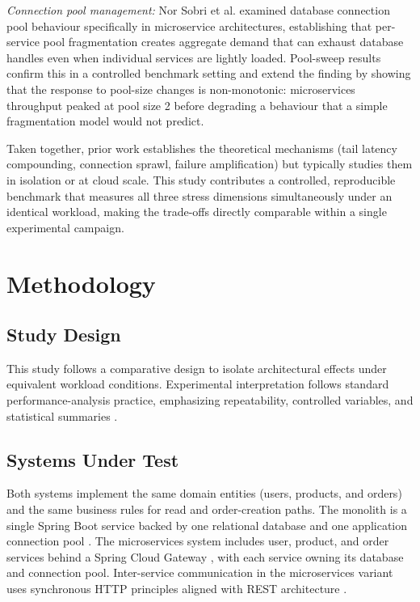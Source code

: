 \documentclass[smallextended,natbib]{svjour3}
\begin{document}
\textit{Connection pool management:} Nor Sobri et al. \cite{nor2022database} examined database connection pool behaviour specifically in microservice architectures, establishing that per-service pool fragmentation creates aggregate demand that can exhaust database handles even when individual services are lightly loaded. Pool-sweep results confirm this in a controlled benchmark setting and extend the finding by showing that the response to pool-size changes is non-monotonic: microservices throughput peaked at pool size 2 before degrading a behaviour that a simple fragmentation model would not predict.

Taken together, prior work establishes the theoretical mechanisms (tail latency compounding, connection sprawl, failure amplification) but typically studies them in isolation or at cloud scale. This study contributes a controlled, reproducible benchmark that measures all three stress dimensions simultaneously under an identical workload, making the trade-offs directly comparable within a single experimental campaign.

\section{Methodology}\label{sec-methodology}

\subsection{Study Design}

This study follows a comparative design to isolate architectural effects under equivalent workload conditions. Experimental interpretation follows standard performance-analysis practice, emphasizing repeatability, controlled variables, and statistical summaries \cite{jain_performance}.

\subsection{Systems Under Test}

Both systems implement the same domain entities (users, products, and orders) and the same business rules for read and order-creation paths. The monolith is a single Spring Boot service \cite{spring_boot} backed by one relational database and one application connection pool \cite{hikaricp}. The microservices system includes user, product, and order services behind a Spring Cloud Gateway \cite{spring_cloud_gateway}, with each service owning its database and connection pool. Inter-service communication in the microservices variant uses synchronous HTTP principles aligned with REST architecture \cite{rest_fielding}.
\end{document}
